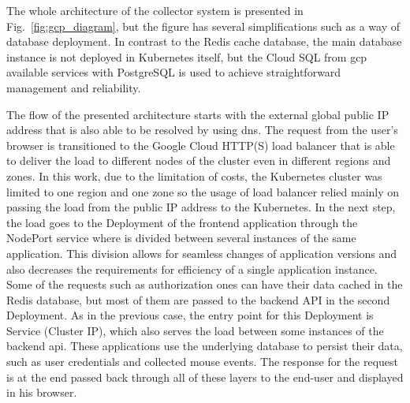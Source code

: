 The whole architecture of the collector system is presented in Fig.~\ref{fig:gcp_diagram}, but the figure has several simplifications such as a way of database deployment.
In contrast to the Redis cache database, the main database instance is not deployed in Kubernetes itself, but the Cloud SQL from \gls{gcp} available services with \mbox{PostgreSQL} is used to achieve straightforward management and reliability.

The flow of the presented architecture starts with the external global public IP address that is also able to be resolved by using \gls{dns}.
The request from the user's browser is transitioned to the Google Cloud HTTP(S) load balancer that is able to deliver the load to different nodes of the cluster even in different regions and zones.
In this work, due to the limitation of costs, the Kubernetes cluster was limited to one region and one zone so the usage of load balancer relied mainly on passing the load from the public IP address to the Kubernetes.
In the next step, the load goes to the Deployment of the frontend application through the NodePort service where is divided between several instances of the same application.
This division allows for seamless changes of application versions and also decreases the requirements for efficiency of a single application instance.
Some of the requests such as authorization ones can have their data cached in the Redis database, but most of them are passed to the backend API in the second Deployment.
As in the previous case, the entry point for this Deployment is Service (Cluster IP), which also serves the load between some instances of the backend \gls{api}.
These applications use the underlying database to persist their data, such as user credentials and collected mouse events.
The response for the request is at the end passed back through all of these layers to the end-user and displayed in his browser.